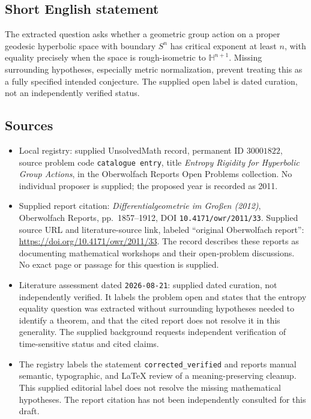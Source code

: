 \documentclass[11pt]{article}
\begin{document}
\subsection{Short English statement}
The extracted question asks whether a geometric group action on a proper geodesic hyperbolic space with boundary \(S^n\) has critical exponent at least \(n\), with equality precisely when the space is rough-isometric to \(\mathbb H^{n+1}\). Missing surrounding hypotheses, especially metric normalization, prevent treating this as a fully specified intended conjecture. The supplied open label is dated curation, not an independently verified status.
\subsection{Sources}
\begin{itemize}
\item Local registry: supplied UnsolvedMath record, permanent ID \(30001822\), source problem code \texttt{catalogue entry}, title \emph{Entropy Rigidity for Hyperbolic Group Actions}, in the Oberwolfach Reports Open Problems collection. No individual proposer is supplied; the proposed year is recorded as 2011.
\item Supplied report citation: \emph{Differentialgeometrie im Großen (2012)}, Oberwolfach Reports, pp.~1857--1912, DOI \texttt{10.4171/owr/2011/33}. Supplied source URL and literature-source link, labeled ``original Oberwolfach report'': \url{https://doi.org/10.4171/owr/2011/33}. The record describes these reports as documenting mathematical workshops and their open-problem discussions. No exact page or passage for this question is supplied.
\item Literature assessment dated \texttt{2026-08-21}: supplied dated curation, not independently verified. It labels the problem open and states that the entropy equality question was extracted without surrounding hypotheses needed to identify a theorem, and that the cited report does not resolve it in this generality. The supplied background requests independent verification of time-sensitive status and cited claims.
\item The registry labels the statement \texttt{corrected\_verified} and reports manual semantic, typographic, and LaTeX review of a meaning-preserving cleanup. This supplied editorial label does not resolve the missing mathematical hypotheses. The report citation has not been independently consulted for this draft.
\end{itemize}
\end{document}
